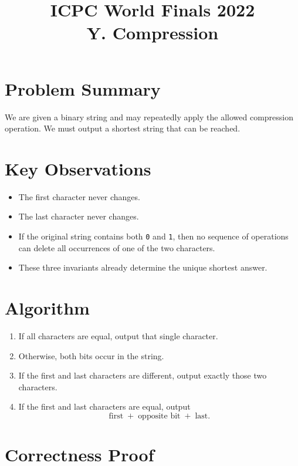 \documentclass[11pt]{article}
\title{ICPC World Finals 2022\\Y. Compression}
\author{}
\date{}
\begin{document}
\maketitle

\section*{Problem Summary}

We are given a binary string and may repeatedly apply the allowed compression operation. We must
output a shortest string that can be reached.

\section*{Key Observations}

\begin{itemize}[leftmargin=*]
    \item The first character never changes.
    \item The last character never changes.
    \item If the original string contains both \texttt{0} and \texttt{1}, then no sequence of operations can
    delete all occurrences of one of the two characters.
    \item These three invariants already determine the unique shortest answer.
\end{itemize}

\section*{Algorithm}

\begin{enumerate}[leftmargin=*]
    \item If all characters are equal, output that single character.
    \item Otherwise, both bits occur in the string.
    \item If the first and last characters are different, output exactly those two characters.
    \item If the first and last characters are equal, output
    \[
    \text{first} \;+\; \text{opposite bit} \;+\; \text{last}.
    \]
\end{enumerate}

\section*{Correctness Proof}
\end{document}
